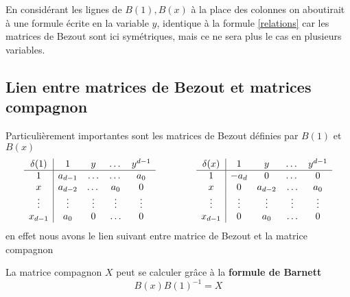 \documentclass{standalone}
\begin{document}
\begin{rem}
En considérant les lignes de $B(1), B(x)$ à la place des colonnes on aboutirait à une formule écrite en la variable $y$, identique à la formule \ref{relations} car les matrices de Bezout sont ici symétriques, mais ce ne sera plus le cas en plusieurs variables.
\end{rem}


\subsection{Lien entre matrices de Bezout et matrices compagnon}
\label{Bar}
Particulièrement importantes sont les matrices de Bezout définies par $B(1)$ et $B(x)$
\begin{equation}
	\begin{array}{c|cccc}
		\delta(1) & 1 & y & \dots & y^{d-1} \\
		\hline
		1 & a_{d-1} & \ldots & \dots & a_0 \\
		x & a_{d-2} & \dots & a_0 & 0 \\
		\vdots & \vdots & \vdots & \vdots & \vdots \\
		x_{d-1} & a_0 & 0 & \ldots & 0 \\
	\end{array}
	\hspace{1.5cm}
	\begin{array}{c|cccc}
		\delta(x) & 1 & y & \dots & y^{d-1} \\
		\hline
		1 & -a_{d} & 0 & \dots & 0 \\
		x & 0 & a_{d-2} & \ldots & a_0 \\
		\vdots & \vdots & \vdots & \vdots & \vdots \\
		x_{d-1} & 0 & a_0 & \ldots & 0 \\
	\end{array}
\end{equation}
en effet nous avons le lien suivant entre matrice de Bezout et la matrice compagnon
\begin{prop}
\label{Barnett}
La matrice compagnon $X$ peut se calculer grâce à la {\bf formule de Barnett}
\cite{Barnett}
\begin{equation}
	B(x)B(1)^{-1} = X
\end{equation}
\end{prop}
\end{document}
